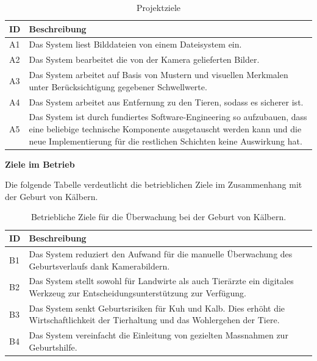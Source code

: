 \begin{table} [H]
	
	
	\begin{tabular}{ p{1cm} p{14cm} }
				
		\toprule[1pt]
		\rowcolor{maroon!30}	
		ID & Beschreibung \\
		
		\midrule 
		A1 & Das System liest Bilddateien von einem Dateisystem ein.\\		
		A2 & Das System bearbeitet die von der Kamera gelieferten Bilder.\\				
		A3 & Das System arbeitet auf Basis von Mustern und visuellen Merkmalen unter Berücksichtigung gegebener Schwellwerte. \\		
		A4 & Das System arbeitet aus Entfernung zu den Tieren, sodass es sicherer ist.\\				
		A5 & Das System ist durch fundiertes Software-Engineering so aufzubauen,
		dass eine beliebige technische Komponente ausgetauscht werden kann und die
		neue Implementierung für die restlichen Schichten keine Auswirkung hat.\\		
		
		\bottomrule
	\end{tabular}
	\caption{Projektziele}
	\label{tab: Projektziele}
\end{table}

\newpage

\textbf{Ziele im Betrieb}


Die folgende Tabelle verdeutlicht die betrieblichen Ziele im Zusammenhang mit der Geburt von Kälbern.

\begin{table}[H]
	
	\begin{tabular}{ p{1cm} p{14cm} }
		
		\toprule[1pt]
		\rowcolor{maroon!30}	
		ID & Beschreibung \\
		
		\midrule 
		B1 & Das System reduziert den Aufwand für die manuelle Überwachung des Geburtsverlaufs dank Kamerabildern. \\
		B2 & Das System stellt sowohl für Landwirte als auch Tierärzte ein digitales Werkzeug zur Entscheidungsunterstützung zur Verfügung.\\
		B3 & Das System senkt Geburtsrisiken für Kuh und Kalb. Dies erhöht die Wirtschaftlichkeit der Tierhaltung und das Wohlergehen der Tiere. \\
		B4 & Das System vereinfacht die Einleitung von gezielten Massnahmen zur Geburtshilfe.\\
		\bottomrule
		
	\end{tabular}
	\caption{Betriebliche Ziele für die Überwachung bei der Geburt von Kälbern.}
	\label{tab: Betriebliche Ziele für die Überwachung bei der Geburt von Kälbern.}
\end{table}


